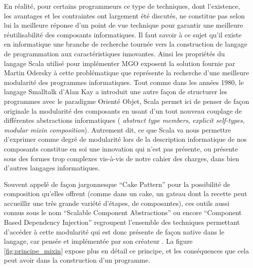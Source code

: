 En réalité, pour certains programmeurs \textcite{Odersky2005} ce type de techniques, dont l'existence, les avantages et les contraintes ont largement été discutés, ne constitue pas selon lui la meilleure réponse d'un point de vue technique pour garantir une meilleure réutilisabilité des composants informatiques. Il faut savoir à ce sujet qu'il existe en informatique une branche de recherche tournée vers la construction de langage de programmation aux caractéristiques innovantes. Ainsi les propriétés du langage Scala utilisé pour implémenter MGO exposent la solution fournie par Martin Odersky à cette problématique que représente la recherche d'une meilleure modularité des programmes informatiques. Tout comme dans les années 1980, le langage Smalltalk d'Alan Kay a introduit une autre façon de structurer les programmes avec le paradigme Orienté Objet, Scala permet ici de penser de façon originale la modularité des composants en usant d'un tout nouveau couplage de différentes abstractions informatiques ( \textit{abstract type members}, \textit{explicit self-types}, \textit{modular mixin composition}). Autrement dit, ce que Scala va nous permettre d'exprimer comme degré de modularité lors de la description informatique de nos composants constitue en soi une innovation qui n'est pas présente, ou présente sous des formes trop complexes vis-à-vis de notre cahier des charges, dans bien d'autres langages informatiques.




Souvent appelé de façon jargonnesque \foreignquote{english}{Cake Pattern} pour la possibilité de composition qu'elles offrent (comme dans un cake, un gateau dont la recette peut accueillir une très grande variété d'étapes, de composantes), ces outils aussi connus sous le nom \foreignquote{english}{Scalable Component Abstractions} ou encore \foreignquote{english}{Component Based Dependency Injection} regroupent  l'ensemble des techniques permettant d'accéder à cette modularité qui est donc présente de façon native dans le langage, car pensée et implémentée par son créateur \autocite{Odersky2005}. La figure \ref{fig:principe_mixin} expose plus en détail ce principe, et les conséquences que cela peut avoir dans la construction d'un programme.



